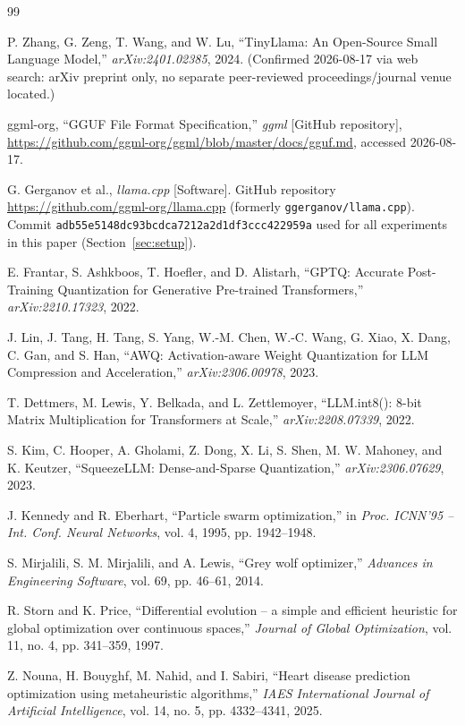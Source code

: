 \documentclass[journal]{IEEEtran}
\begin{document}
\begin{thebibliography}{99}

 P. Zhang, G. Zeng, T. Wang, and W. Lu, ``TinyLlama: An Open-Source Small Language Model,'' \emph{arXiv:2401.02385}, 2024. (Confirmed 2026-08-17 via web search: arXiv preprint only, no separate peer-reviewed proceedings/journal venue located.)

 ggml-org, ``GGUF File Format Specification,'' \emph{ggml} [GitHub repository], \url{https://github.com/ggml-org/ggml/blob/master/docs/gguf.md}, accessed 2026-08-17.

 G. Gerganov et al., \emph{llama.cpp} [Software]. GitHub repository \url{https://github.com/ggml-org/llama.cpp} (formerly \texttt{ggerganov/llama.cpp}). Commit \texttt{adb55e5148dc93bcdca7212a2d1df3ccc422959a} used for all experiments in this paper (Section~\ref{sec:setup}).

 E. Frantar, S. Ashkboos, T. Hoefler, and D. Alistarh, ``GPTQ: Accurate Post-Training Quantization for Generative Pre-trained Transformers,'' \emph{arXiv:2210.17323}, 2022.

 J. Lin, J. Tang, H. Tang, S. Yang, W.-M. Chen, W.-C. Wang, G. Xiao, X. Dang, C. Gan, and S. Han, ``AWQ: Activation-aware Weight Quantization for LLM Compression and Acceleration,'' \emph{arXiv:2306.00978}, 2023.

 T. Dettmers, M. Lewis, Y. Belkada, and L. Zettlemoyer, ``LLM.int8(): 8-bit Matrix Multiplication for Transformers at Scale,'' \emph{arXiv:2208.07339}, 2022.

 S. Kim, C. Hooper, A. Gholami, Z. Dong, X. Li, S. Shen, M. W. Mahoney, and K. Keutzer, ``SqueezeLLM: Dense-and-Sparse Quantization,'' \emph{arXiv:2306.07629}, 2023.

 J. Kennedy and R. Eberhart, ``Particle swarm optimization,'' in \emph{Proc. ICNN'95 -- Int. Conf. Neural Networks}, vol. 4, 1995, pp. 1942--1948.

 S. Mirjalili, S. M. Mirjalili, and A. Lewis, ``Grey wolf optimizer,'' \emph{Advances in Engineering Software}, vol. 69, pp. 46--61, 2014.

 R. Storn and K. Price, ``Differential evolution -- a simple and efficient heuristic for global optimization over continuous spaces,'' \emph{Journal of Global Optimization}, vol. 11, no. 4, pp. 341--359, 1997.

 Z. Nouna, H. Bouyghf, M. Nahid, and I. Sabiri, ``Heart disease prediction optimization using metaheuristic algorithms,'' \emph{IAES International Journal of Artificial Intelligence}, vol. 14, no. 5, pp. 4332--4341, 2025.


\end{thebibliography}
\end{document}
